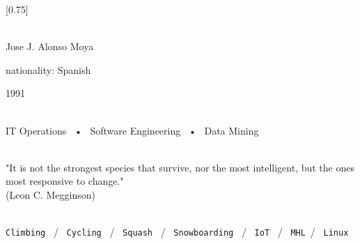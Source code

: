 \documentclass[lighthipster]{simplehipstercv}
\begin{document}
\setlength{\columnsep}{1.5cm}
[0.75]
\begin{paracol}{2}

\paracolbackgroundoptions



\footnotesize
{\setasidefontcolour
\flushright
\begin{center}
\end{center}



 \\[0.5em]
Jose J. Alonso Moya

nationality: Spanish 

1991

\bigskip

 \\[0.5em]

IT Operations ~•~ Software Engineering ~•~ Data Mining

\bigskip



\bigskip

\\[0.5em]

"It is not the strongest species that survive, nor the most intelligent, but the ones most responsive to change." \\
(Leon C. Megginson)
\bigskip

\\[0.5em]

\texttt{Climbing} ~/~ \texttt{Cycling} ~/~ \texttt{Squash} ~/~ \texttt{Snowboarding} ~/~ \texttt{IoT} ~/~ \texttt{MHL}~/~ \texttt{Linux}

\vspace{4em}


\phantom{turn the page}

}
\end{paracol}
\end{document}
